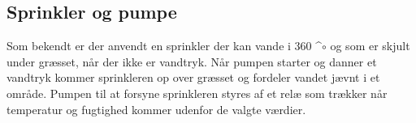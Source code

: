 \subsection{Sprinkler og pumpe}
Som bekendt er der anvendt en sprinkler der kan vande i 360 ^${\circ}$ og som er skjult under græsset, når der ikke er vandtryk. Når pumpen starter og danner et vandtryk kommer sprinkleren op over græsset og fordeler vandet jævnt i et område. 
Pumpen til at forsyne sprinkleren styres af et relæ som trækker når temperatur og fugtighed kommer udenfor de valgte værdier.

